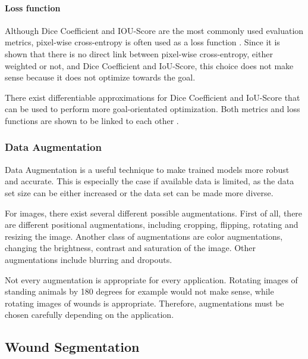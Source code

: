 
\paragraph{Loss function}

Although Dice Coefficient and IOU-Score are the most commonly used evaluation metrics, pixel-wise cross-entropy is often used as a loss function \cite{Eelbode}. Since it is shown that there is no direct link between pixel-wise cross-entropy, either weighted or not, and Dice Coefficient and IoU-Score, this choice does not make sense because it does not optimize towards the goal.

There exist differentiable approximations for Dice Coefficient and IoU-Score that can be used to perform more goal-orientated optimization. Both metrics and loss functions are shown to be linked to each other \cite{Eelbode}.


\subsubsection{Data Augmentation}

Data Augmentation is a useful technique to make trained models more robust and accurate. This is especially the case if available data is limited, as the data set size can be either increased or the data set can be made more diverse.

For images, there exist several different possible augmentations. First of all, there are different positional augmentations, including cropping, flipping, rotating and resizing the image. Another class of augmentations are color augmentations, changing the brightness, contrast and saturation of the image. Other augmentations include blurring and dropouts.

Not every augmentation is appropriate for every application. Rotating images of standing animals by 180 degrees for example would not make sense, while rotating images of wounds is appropriate. Therefore, augmentations must be chosen carefully depending on the application.




\subsection{Wound Segmentation}


